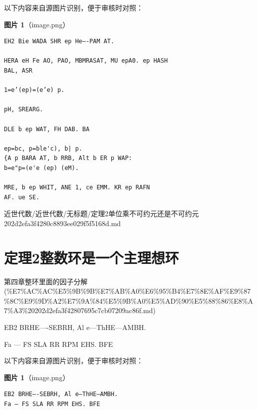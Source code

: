\begin{note}
以下内容来自源图片识别，便于审核时对照：

\textbf{图片 1}（image.png）
\begin{Verbatim}[fontsize=\small]
EH2 Bie WADA SHR ep He—-PAM AT.

HERA eH Fe AO, PAO, MBMRASAT, MU epA0. ep HASH
BAL, ASR

1=e’(ep)=(e’e) p.

pH, SREARG.

DLE b ep WAT, FH DAB. BA

ep=bc, p=ble'c), b| p.
{A p BARA AT, b RRB, Alt b ER p WAP:
b=e"p=(e'e (ep) (eM).

MRE, b ep WHIT, ANE 1, ce EMM. KR ep RAFN
AF. ue SE.
\end{Verbatim}

\end{note}

\begin{note}[来源路径]

近世代数/近世代数/无标题/定理2单位乘不可约元还是不可约元 202d2efa3f4280c8893ee029f5f5168d.md

\end{note}

\section*{定理2整数环是一个主理想环}

\begin{note}[来源上级主题]

第四章整环里面的因子分解 (\%E7\%AC\%AC\%E5\%9B\%9B\%E7\%AB\%A0\%E6\%95\%B4\%E7\%8E\%AF\%E9\%87\%8C\%E9\%9D\%A2\%E7\%9A\%84\%E5\%9B\%A0\%E5\%AD\%90\%E5\%88\%86\%E8\%A7\%A3\%20202d2efa3f42807695c7cb07209ac86f.md)

\end{note}

\begin{theorem}[定理2整数环是一个主理想环]

EB2 BRHE—-SEBRH, Al e—ThHE—AMBH.

Fa — FS SLA RR RPM EHS. BFE

\end{theorem}

\begin{note}
以下内容来自源图片识别，便于审核时对照：

\textbf{图片 1}（image.png）
\begin{Verbatim}[fontsize=\small]
EB2 BRHE—-SEBRH, Al e—ThHE—AMBH.
Fa — FS SLA RR RPM EHS. BFE
\end{Verbatim}

\end{note}

